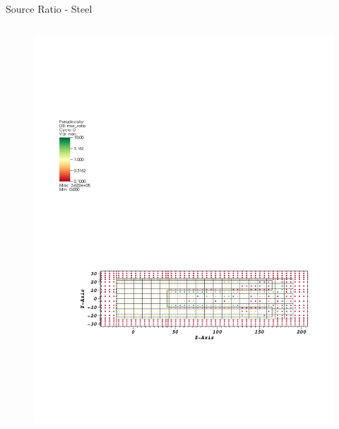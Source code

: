 \documentclass{beamer}
\begin{document}
\begin{frame}{Source Ratio - Steel}
\begin{columns}[T]
        \begin{figure}
                \includegraphics[scale=0.5,trim={1cm 16cm 9cm 5cm},clip]{figs/src_ratio_mer.pdf}
        \end{figure}
  \end{columns}
\end{frame}
\end{document}
